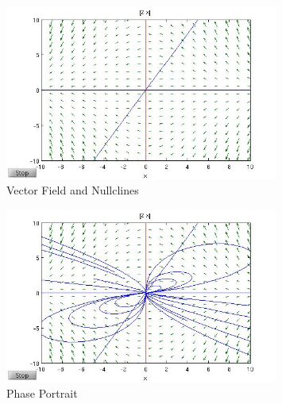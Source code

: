 \documentclass[12pt]{article}
\begin{document}
\begin{figure} [H]
    \centering
    \includegraphics[width=0.8\textwidth]{Question2_VectorField}
    \caption{ Vector Field and Nullclines}
    \label{figure:a0}
\end{figure}


\begin{figure} [H]
    \centering
    \includegraphics[width=0.8\textwidth]{Question2_PhasePortrait}
    \caption{ Phase Portrait}
    \label{figure:a0}
\end{figure}
\end{document}
